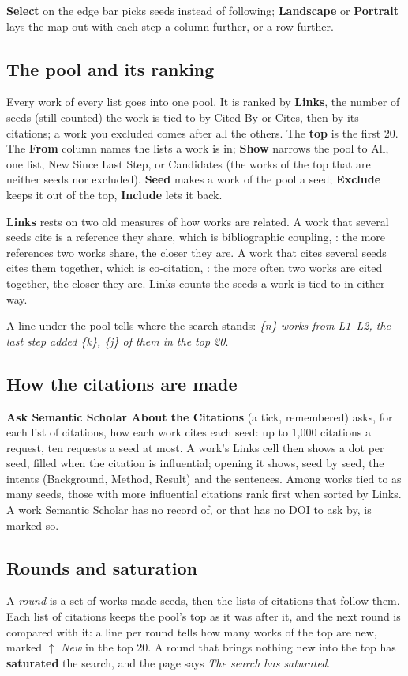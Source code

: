 \textbf{Select} on the edge bar picks seeds instead of following; \textbf{Landscape} or \textbf{Portrait} lays the map
out with each step a column further, or a row further.

\subsection{The pool and its ranking}
Every work of every list goes into one pool. It is ranked by \textbf{Links}, the number of seeds (still counted) the work is
tied to by Cited By or Cites, then by its citations; a work you excluded comes after all the others. The \textbf{top} is
the first 20. The \textbf{From} column names the lists a work is in; \textbf{Show} narrows the pool to All, one list, New
Since Last Step, or Candidates (the works of the top that are neither seeds nor excluded). \textbf{Seed} makes a work of
the pool a seed; \textbf{Exclude} keeps it out of the top, \textbf{Include} lets it back.

\textbf{Links} rests on two old measures of how works are related. A work that several seeds cite is a reference
they share, which is bibliographic coupling, : the more references two works share,
the closer they are. A work that cites several seeds cites them together, which is co-citation,
: the more often two works are cited together, the closer they are. Links counts the
seeds a work is tied to in either way.

A line under the pool tells where the search stands: \emph{\{n\} works from L1--L2, the last step added \{k\}, \{j\} of
them in the top 20}.

\subsection{How the citations are made}
\textbf{Ask Semantic Scholar About the Citations} (a tick, remembered) asks, for each list of citations, how each work
cites each seed: up to 1,000 citations a request, ten requests a seed at most. A work's Links cell then shows a dot per
seed, filled when the citation is influential; opening it shows, seed by seed, the intents (Background, Method, Result)
and the sentences. Among works tied to as many seeds, those with more influential citations rank first when sorted by
Links. A work Semantic Scholar has no record of, or that has no DOI to ask by, is marked so.

\subsection{Rounds and saturation}
A \emph{round} is a set of works made seeds, then the lists of citations that follow them. Each list of citations keeps
the pool's top as it was after it, and the next round is compared with it: a line per round tells how many works of the
top are new, marked $\uparrow$ \emph{New} in the top 20. A round that brings nothing new into the top has
\textbf{saturated} the search, and the page says \emph{The search has saturated}.

